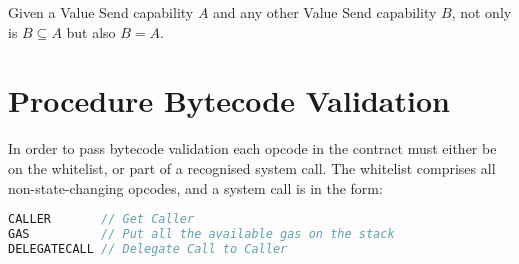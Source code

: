 \documentclass[english,a4paper]{article}
\begin{document}
Given a Value Send capability $A$ and any other Value Send capability $B$, not
only is $B \subseteq A$ but also $B = A$.

\section{Procedure Bytecode Validation}\label{bytecode-validation}
In order to pass bytecode validation each opcode in the contract must either be
on the whitelist, or part of a recognised system call. The whitelist comprises
all non-state-changing opcodes, and a system call is in the form:

\begin{minipage}{\linewidth}
\begin{lstlisting}[language=c,commentstyle=\color{mygreen},basicstyle=\ttfamily,
  identifierstyle=\color{blue},
  caption=Sequence of steps to perform a system call.]
CALLER       // Get Caller
GAS          // Put all the available gas on the stack
DELEGATECALL // Delegate Call to Caller
\end{lstlisting}
\end{minipage}
\end{document}
